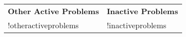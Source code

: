 \documentclass[12pt]{article}
\begin{document}
\begin{minipage}[t]{0.5\linewidth}
\subsection*{}
\begin{tabular}{p{9cm} p{9cm}}
{\bf Other Active Problems} & {\bf Inactive Problems} \\
!otheractiveproblems & !inactiveproblems \\
\end{tabular}
\end{minipage}
\end{document}
